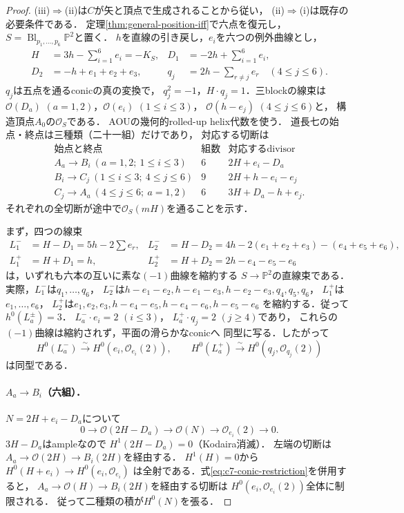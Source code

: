 \begin{proof}
(iii)$\Rightarrow$(ii)は$C$が矢と頂点で生成されることから従い，
(ii)$\Rightarrow$(i)は既存の必要条件である．
定理\ref{thm:general-position-iff}で六点を復元し，
$S=\operatorname{Bl}_{p_1,\ldots,p_6}\mathbb P^2$と置く．
$h$を直線の引き戻し，$e_i$を六つの例外曲線とし，
\[
\begin{aligned}
H&=3h-\sum_{i=1}^6e_i=-K_S, &
D_1&=-2h+\sum_{i=1}^6e_i,\\
D_2&=-h+e_1+e_2+e_3, &
q_j&=2h-\sum_{r\ne j}e_r \quad(4\le j\le6).
\end{aligned}
\]
$q_j$は五点を通るconicの真の変換で，
$q_j^2=-1$，$H\cdot q_j=1$．三blockの線束は
$\mathcal O(D_a)$ $(a=1,2)$，$\mathcal O(e_i)$ $(1\le i\le3)$，
$\mathcal O(h-e_j)$ $(4\le j\le6)$と，
構造頂点$A_0$の$\mathcal O_S$である．
AOU\cite[(4.9)]{AOU}の幾何的rolled-up helix代数を使う．
道長七の始点・終点は三種類（二十一組）だけであり，
対応する切断は
\[
\begin{array}{c|c|c}
\text{始点と終点}&\text{組数}&\text{対応するdivisor}\\\hline
 A_a\to B_i\ (a=1,2;\ 1\le i\le3)&6&2H+e_i-D_a\\
 B_i\to C_j\ (1\le i\le3;\ 4\le j\le6)&9&2H+h-e_i-e_j\\
 C_j\to A_a\ (4\le j\le6;\ a=1,2)&6&3H+D_a-h+e_j .
\end{array}
\]
それぞれの全切断が途中で$\mathcal O_S(mH)$を通ることを示す．

まず，四つの線束
\[
\begin{aligned}
L^-_1&=H-D_1=5h-2\sum e_r,&
L^-_2&=H-D_2=4h-2(e_1+e_2+e_3)-(e_4+e_5+e_6),\\
L^+_1&=H+D_1=h,&
L^+_2&=H+D_2=2h-e_4-e_5-e_6
\end{aligned}
\]
は，いずれも六本の互いに素な$(-1)$曲線を縮約する
$S\to\mathbb P^2$の直線束である．
実際，$L^-_1$は$q_1,\ldots,q_6$，
$L^-_2$は$h-e_1-e_2,h-e_1-e_3,h-e_2-e_3,q_4,q_5,q_6$，
$L^+_1$は$e_1,\ldots,e_6$，
$L^+_2$は$e_1,e_2,e_3,h-e_4-e_5,h-e_4-e_6,h-e_5-e_6$
を縮約する．従って$h^0(L_a^\pm)=3$．
$L^-_a\cdot e_i=2$ $(i\le3)$，
$L^+_a\cdot q_j=2$ $(j\ge4)$であり，
これらの$(-1)$曲線は縮約されず，平面の滑らかなconicへ
同型に写る．したがって
\begin{equation}\label{eq:c7-conic-restriction}
H^0(L^-_a)\xrightarrow{\sim}H^0(e_i,\mathcal O_{e_i}(2)),
\qquad
H^0(L^+_a)\xrightarrow{\sim}H^0(q_j,\mathcal O_{q_j}(2))
\end{equation}
は同型である．

\paragraph{$A_a\to B_i$（六組）．}
$N=2H+e_i-D_a$について
\[
0\to\mathcal O(2H-D_a)\to\mathcal O(N)
\to\mathcal O_{e_i}(2)\to0 .
\]
$3H-D_a$はampleなので
$H^1(2H-D_a)=0$（Kodaira消滅）．
左端の切断は$A_a\to\mathcal O(2H)\to B_i(2H)$を経由する．
$H^1(H)=0$から$H^0(H+e_i)\to H^0(e_i,\mathcal O_{e_i})$
は全射である．式\eqref{eq:c7-conic-restriction}を併用すると，
$A_a\to\mathcal O(H)\to B_i(2H)$を経由する切断は
$H^0(e_i,\mathcal O_{e_i}(2))$全体に制限される．
従って二種類の積が$H^0(N)$を張る．


\end{proof}
